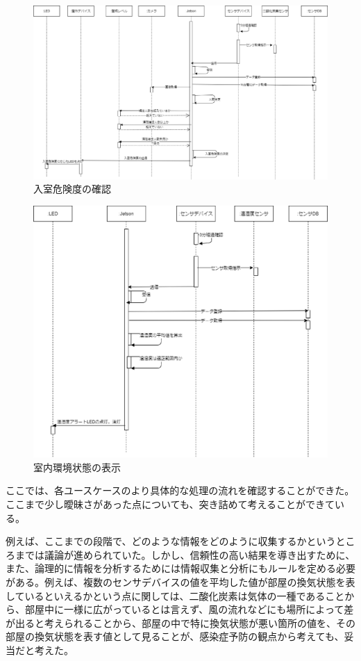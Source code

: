 \begin{figure}[H]
	\centering
	\includegraphics[width=15cm]{s_nyuusitu.eps}
	\caption{入室危険度の確認}
	\label{s_nyuusitu}
\end{figure}
\begin{figure}[H]
	\centering
	\includegraphics[width=15cm]{s_situnaikankyou.eps}
	\caption{室内環境状態の表示}
	\label{s_situnaikankyou}
\end{figure}

ここでは、各ユースケースのより具体的な処理の流れを確認することができた。ここまで少し曖昧さがあった点についても、突き詰めて考えることができている。

例えば、ここまでの段階で、どのような情報をどのように収集するかというところまでは議論が進められていた。しかし、信頼性の高い結果を導き出すために、また、論理的に情報を分析するためには情報収集と分析にもルールを定める必要がある。例えば、複数のセンサデバイスの値を平均した値が部屋の換気状態を表しているといえるかという点に関しては、二酸化炭素は気体の一種であることから、部屋中に一様に広がっているとは言えず、風の流れなどにも場所によって差が出ると考えられることから、部屋の中で特に換気状態が悪い箇所の値を、その部屋の換気状態を表す値として見ることが、感染症予防の観点から考えても、妥当だと考えた。

